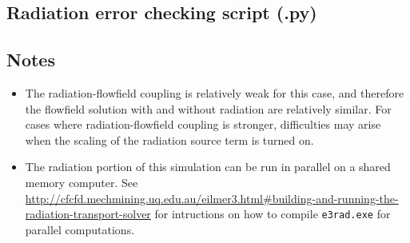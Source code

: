 \subsection{Radiation error checking script (.py)}
\topbar

\bottombar

\subsection{Notes}

\begin{itemize}
 \item The radiation-flowfield coupling is relatively weak for this case, and therefore the flowfield solution with and without radiation are relatively similar.
For cases where radiation-flowfield coupling is stronger, difficulties may arise when the scaling of the radiation source term is turned on.
 \item The radiation portion of this simulation can be run in parallel on a shared memory computer.  See \url{http://cfcfd.mechmining.uq.edu.au/eilmer3.html#building-and-running-the-radiation-transport-solver} for intructions on how to compile \texttt{e3rad.exe} for parallel computations.
\end{itemize}